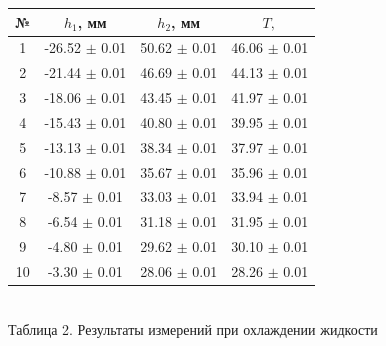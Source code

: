 \documentclass[a4paper, 12pt]{article}
\begin{document}
		\begin{center}
		\begin{tabular} {|c | c |c |c |}
			\hline	
			№ & $h_1$, мм &  $h_2$, мм  &  $T,$  \textcelsius \\
			\hline
			1 & -26.52 $\pm$ 0.01  & 50.62 $\pm$ 0.01 & 46.06 $\pm$ 0.01 \\
			\hline
			2 & -21.44 $\pm$ 0.01 & 46.69 $\pm$ 0.01 & 44.13 $\pm$ 0.01 \\
			\hline
			3 & -18.06 $\pm$ 0.01 & 43.45 $\pm$ 0.01 & 41.97 $\pm$ 0.01 \\
			\hline
			4 & -15.43 $\pm$ 0.01 & 40.80 $\pm$ 0.01 & 39.95 $\pm$ 0.01 \\
			\hline
			5 & -13.13 $\pm$ 0.01 & 38.34 $\pm$ 0.01 & 37.97 $\pm$ 0.01 \\
			\hline
			6 & -10.88 $\pm$ 0.01 & 35.67 $\pm$ 0.01 & 35.96 $\pm$ 0.01 \\
			\hline
			7 & -8.57 $\pm$ 0.01 & 33.03 $\pm$ 0.01 & 33.94 $\pm$ 0.01 \\
			\hline
			8 & -6.54 $\pm$ 0.01 & 31.18 $\pm$ 0.01 & 31.95 $\pm$ 0.01 \\
			\hline
			9 & -4.80 $\pm$ 0.01 & 29.62 $\pm$ 0.01 & 30.10 $\pm$ 0.01 \\
			\hline
			10 & -3.30 $\pm$ 0.01 & 28.06 $\pm$ 0.01 & 28.26 $\pm$ 0.01 \\
			\hline
		\end{tabular}\\
		Таблица 2. Результаты измерений при охлаждении жидкости
	\end{center}


	
	
\end{document}
